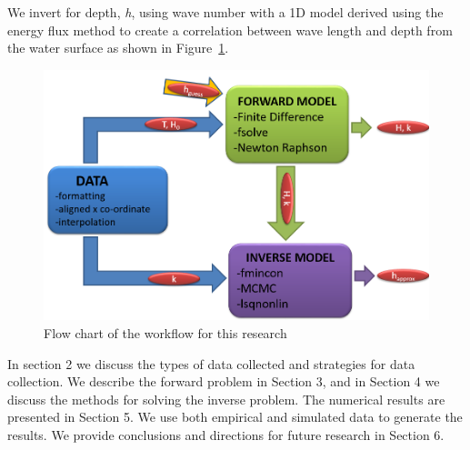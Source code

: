 We invert for depth, \textit{h}, using wave number with a 1D model derived using the energy flux method to create a correlation between wave length and depth from the water surface as shown in Figure~\ref{flowchart}.
\begin{figure}[H]
		\centering
		\includegraphics[width=.7\linewidth]{img/Flow_Chart.png}
		\caption{Flow chart of the workflow for this research}
		\label{flowchart}
\end{figure}
In section 2 we discuss the types of data collected and strategies for data collection. We describe the forward problem in Section 3, and in Section 4 we discuss the methods for solving the inverse problem. The numerical results are presented in Section 5. We use both empirical and simulated data to generate the results. We provide conclusions and directions for future research in Section 6.